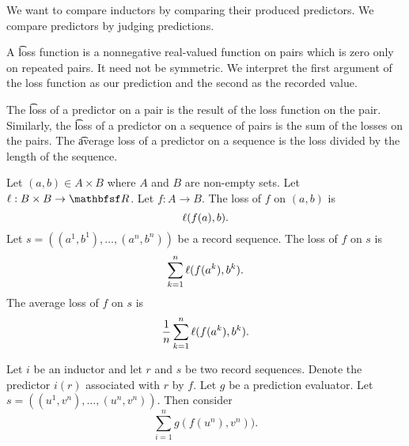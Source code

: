 
\sbasic



























\sstart
{}


We want to compare inductors
by comparing their produced predictors.
We compare predictors by judging predictions.


A \t{loss} function is a nonnegative real-valued function on pairs which is zero only on repeated pairs.
It need not be symmetric.
We interpret the first argument of the
loss function as our prediction
and the second as the recorded value.

The \t{loss of a predictor on a pair} is the
result of the loss function on the pair.
Similarly, the \t{loss of a predictor on  a sequence} of pairs is the sum of the losses on the pairs.
The \t{average loss of a predictor on a sequence} is the loss divided by the length of the sequence.


Let $(a, b) \in A \times B$
where $A$ and $B$ are non-empty sets.
Let $\loss: B \cross B \to \R$.
Let $f: A \to B$.
The loss of $f$ on $(a, b)$ is
\[
  \ell(f(a),b).
\]
Let $s = ((a^1, b^1), \dots, (a^n, b^n))$
be a record sequence.
The loss of $f$ on $s$ is
\[
  \sum_{k = 1}^{n} \ell(f(a^k), b^k).
\]
The average loss of $f$ on $s$ is
\[
  \frac{1}{n} \sum_{k = 1}^{n} \ell(f(a^k), b^k).
\]




Let $i$ be an inductor and let
$r$ and $s$ be two record sequences.
Denote the predictor $i(r)$ associated
with $r$ by $f$.
Let $g$ be a prediction evaluator.
Let $s = ((u^1, v^n), \dots, (u^n, v^n))$.
Then consider
\[
  \sum_{i = 1}^{n} g(f(u^n), v^n)).
\]


